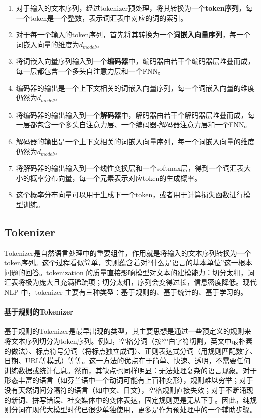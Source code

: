 \begin{enumerate}
    \item 对于输入的文本序列，经过tokenizer预处理，将其转换为一个\textbf{token序列}，每一个token是一个整数，表示词汇表中对应的词的索引。
    \item 对于每一个输入的token序列，首先将其转换为一个\textbf{词嵌入向量序列}，每一个词嵌入向量的维度为$d_{model}$。
    \item 将词嵌入向量序列输入到一个\textbf{编码器}中，编码器由若干个编码器层堆叠而成，每一层都包含一个多头自注意力层和一个FNN。
    \item 编码器的输出是一个上下文相关的词嵌入向量序列，每一个词嵌入向量的维度仍然为$d_{model}$。
    \item 将编码器的输出输入到一个\textbf{解码器}中，解码器由若干个解码器层堆叠而成，每一层都包含一个多头自注意力层、一个编码器-解码器注意力层和一个FNN。
    \item 解码器的输出是一个上下文相关的词嵌入向量序列，每一个词嵌入向量的维度仍然为$d_{model}$。
    \item 将解码器的输出输入到一个线性变换层和一个softmax层，得到一个词汇表大小的概率分布向量，每一个元素表示对应token的生成概率。
    \item 这个概率分布向量可以用于生成下一个token，或者用于计算损失函数进行模型训练。
\end{enumerate}

\subsection{Tokenizer}

Tokenizer是自然语言处理中的重要组件，作用就是将输入的文本序列转换为一个token序列。这个过程看似简单，实则蕴含着对“什么是语言的基本单位”这一根本问题的回答。tokenization 的质量直接影响模型对文本的建模能力：切分太粗，词汇表将极为庞大且充满稀疏项；切分太细，序列会变得过长，信息密度降低。现代 NLP 中，tokenizer 主要有三种类型：基于规则的、基于统计的、基于学习的。

\paragraph{基于规则的Tokenizer} 基于规则的Tokenizer是最早出现的类型，其主要思想是通过一些预定义的规则来将文本序列切分为token序列。例如，空格分词（按空白字符切割，英文中最朴素的做法）、标点符号分词（将标点独立成词）、正则表达式分词（用规则匹配数字、日期、URL等模式）等等。这一方法的优点在于简单、快速、透明，不需要任何训练数据或统计信息。然而，其缺点也同样明显：无法处理复杂的语言现象。对于形态丰富的语言（如芬兰语中一个动词可能有上百种变形），规则难以穷举；对于没有天然词间分隔符的语言（如中文、日文），空格规则直接失效；对于不断涌现的新词、拼写错误、社交媒体中的变体表达，固定规则更是无从下手。因此，纯规则分词在现代大模型时代已很少单独使用，更多是作为预处理中的一个辅助步骤。

